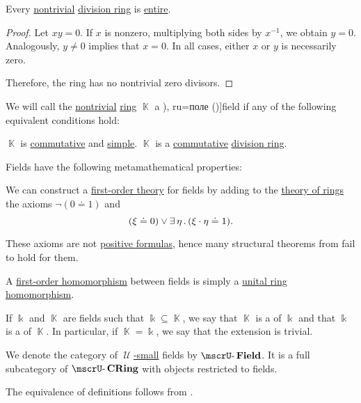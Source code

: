 \begin{proposition}\label{thm:division_ring_is_entire}
  Every \hyperref[def:ring/trivial]{nontrivial} \hyperref[def:division_ring]{division ring} is \hyperref[def:entire_semiring]{entire}.
\end{proposition}
\begin{proof}
  Let \( xy = 0 \). If \( x \) is nonzero, multiplying both sides by \( x^{-1} \), we obtain \( y = 0 \). Analogously, \( y \neq 0 \) implies that \( x = 0 \). In all cases, either \( x \) or \( y \) is necessarily zero.

  Therefore, the ring has no nontrivial zero divisors.
\end{proof}

\begin{definition}\label{def:field}\mimprovised
  We will call the \hyperref[def:ring/trivial]{nontrivial} \hyperref[def:ring]{ring} \( \BbbK \) a \term[bg=поле (\cite[4]{КоцевСидеров2016}), ru=поле (\cite[def. 1.3.2]{Винберг2014})]{field} if any of the following equivalent conditions hold:
  \begin{thmenum}
     \( \BbbK \) is \hyperref[def:ring/commutative]{commutative} and \hyperref[def:simple_object]{simple}.
     \( \BbbK \) is a \hyperref[def:ring/commutative]{commutative} \hyperref[def:division_ring]{division ring}.
  \end{thmenum}

  Fields have the following metamathematical properties:
  \begin{thmenum}
     We can construct a \hyperref[def:first_order_theory]{first-order theory} for fields by adding to the \hyperref[def:semiring/theory]{theory of rings} the axioms \( \neg (0 \doteq 1) \) and
    \begin{equation}\label{eq:def:field/theory/invertibility}
      (\xi \doteq 0) \vee \exists \thinspace \eta \thinspace . \thinspace (\xi \cdot \eta \doteq 1).
    \end{equation}

    These axioms are not \hyperref[def:positive_formula]{positive formulas}, hence many structural theorems from  fail to hold for them.

     A \hyperref[def:first_order_homomorphism]{first-order homomorphism} between fields is simply a \hyperref[def:ring/homomorphism]{unital ring homomorphism}.

     If \( \Bbbk \) and \( \BbbK \) are fields such that \( \Bbbk \subseteq \BbbK \), we say that \( \BbbK \) is a  of \( \Bbbk \) and that \( \Bbbk \) is a  of \( \BbbK \). In particular, if \( \BbbK = \Bbbk \), we say that the extension is trivial.

     We denote the category of \hyperref[def:large_and_small_sets]{\( \mscrU \)-small} fields by \( \ucat{Field} \). It is a full subcategory of \hyperref[def:ring/category]{\( \ucat{CRing} \)} with objects restricted to fields.
  \end{thmenum}
\end{definition}
\begin{defproof}
  The equivalence of definitions follows from .
\end{defproof}
